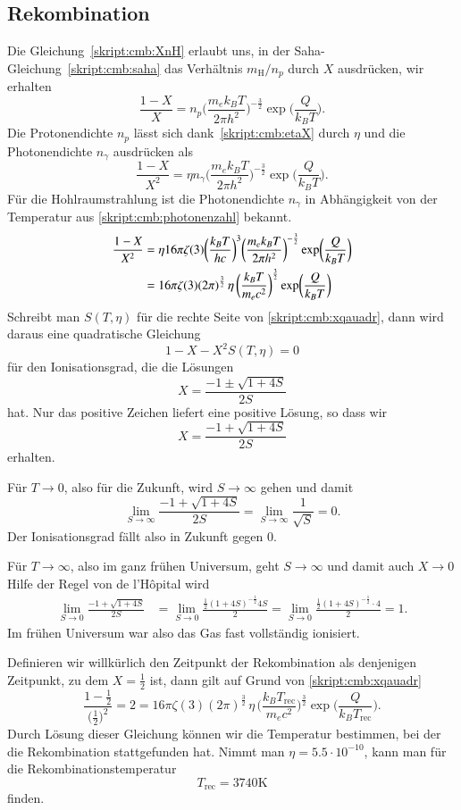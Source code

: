 \subsection{Rekombination}
Die Gleichung~\eqref{skript:cmb:XnH} erlaubt uns, in der
Saha-Gleichung~\eqref{skript:cmb:saha} das Verhältnis $m_\text{H}/n_p$
durch $X$ ausdrücken, wir erhalten
\begin{equation}
\frac{1-X}{X}
=
n_p
\biggl(\frac{m_ek_BT}{2\pi h^2}\biggr)^{-\frac32}
\exp\biggl( \frac{Q}{k_BT} \biggr).
\end{equation}
Die Protonendichte $n_p$ lässt sich dank~\eqref{skript:cmb:etaX}
durch $\eta$ und die Photonendichte $n_\gamma$ ausdrücken als
\[
\frac{1-X}{X^2}=\eta n_\gamma
\biggl(\frac{m_ek_BT}{2\pi h^2}\biggr)^{-\frac32}
\exp\biggl( \frac{Q}{k_BT} \biggr).
\]
Für die Hohlraumstrahlung ist die Photonendichte $n_\gamma$ in Abhängigkeit
von der Temperatur aus \eqref{skript:cmb:photonenzahl} bekannt.
\begin{align}
\frac{1-X}{X^2}
&=\eta
16\pi\zeta(3)
\biggl(\frac{k_BT}{hc}\biggr)^3
\biggl(\frac{m_ek_BT}{2\pi h^2}\biggr)^{-\frac32}
\exp\biggl( \frac{Q}{k_BT} \biggr)
\notag
\\
&=
16\pi\zeta(3)(2\pi)^{\frac32}
\,
\eta
\,
\biggl(\frac{k_BT}{m_ec^2}\biggr)^{\frac32}
\exp\biggl( \frac{Q}{k_BT} \biggr)
\label{skript:cmb:xqauadr}
\end{align}
Schreibt man $S(T,\eta)$ für die rechte Seite von \eqref{skript:cmb:xqauadr},
dann wird daraus eine quadratische Gleichung
\[
1-X-X^2 S(T,\eta)=0
\]
für den Ionisationsgrad, die die Lösungen
\[
X = \frac{-1\pm\sqrt{1+4S}}{2S}
\]
hat.
Nur das positive Zeichen liefert eine positive Lösung, so dass wir
\[
X=\frac{-1+\sqrt{1+4S}}{2S}
\]
erhalten.

Für $T\to 0$, also für die Zukunft, wird $S\to \infty$ gehen
und damit
\[
\lim_{S\to\infty}\frac{-1+\sqrt{1+4S}}{2S}
=
\lim_{S\to\infty}\frac{1}{\sqrt{S}}
=
0.
\]
Der Ionisationsgrad fällt also in Zukunft gegen 0.

Für $T\to\infty$, also im ganz frühen Universum, geht $S\to\infty$
und damit auch $X\to 0$
Hilfe der Regel von de l'H\^opital wird
\begin{align*}
\lim_{S\to 0}\frac{-1+\sqrt{1+4S}}{2S}
&=
\lim_{S\to 0}
\frac{\frac12(1+4S)^{-\frac12} 4S}{2}
=
\lim_{S\to 0}
\frac{\frac12(1+4S)^{-\frac12}\cdot 4}{2}
=
1.
\end{align*}
Im frühen Universum war also das Gas fast vollständig ionisiert.

Definieren wir willkürlich den Zeitpunkt der Rekombination als
denjenigen Zeitpunkt, zu dem $X=\frac12$ ist, dann gilt auf Grund
von \eqref{skript:cmb:xqauadr}
\[
\frac{1-\frac12}{\bigl(\frac12\bigr)^2}
=
2
=
16\pi\zeta(3)(2\pi)^{\frac32}
\,
\eta
\,
\biggl(\frac{k_BT_\text{rec}}{m_ec^2}\biggr)^{\frac32}
\exp\biggl( \frac{Q}{k_BT_\text{rec}} \biggr).
\]
Durch Lösung dieser Gleichung können wir die Temperatur bestimmen,
bei der die Rekombination stattgefunden hat.
Nimmt man $\eta=5.5\cdot 10^{-10}$, kann man für die Rekombinationstemperatur
\[
T_\text{rec} = 3740\text{K}
\]
finden.

